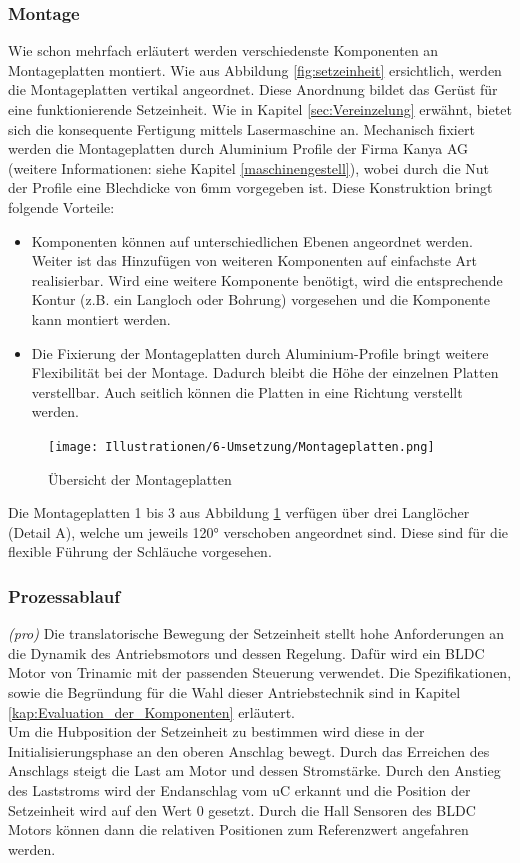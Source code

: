 \subsubsection{Montage}
Wie schon mehrfach erläutert werden verschiedenste Komponenten an Montageplatten montiert. Wie aus Abbildung \ref{fig:setzeinheit} ersichtlich, werden die Montageplatten vertikal angeordnet. Diese Anordnung bildet das Gerüst für eine funktionierende Setzeinheit. Wie in Kapitel \ref{sec:Vereinzelung} erwähnt, bietet sich die konsequente Fertigung mittels Lasermaschine an. Mechanisch fixiert werden die Montageplatten durch Aluminium Profile der Firma Kanya AG (weitere Informationen: siehe Kapitel \ref{maschinengestell}), wobei durch die Nut der Profile eine Blechdicke von 6mm vorgegeben ist. Diese Konstruktion bringt folgende Vorteile:
	\begin{itemize}
	\item Komponenten können auf unterschiedlichen Ebenen angeordnet werden. Weiter ist das Hinzufügen von weiteren Komponenten auf einfachste Art realisierbar. Wird eine weitere Komponente benötigt, wird die entsprechende Kontur (z.B. ein Langloch oder Bohrung) vorgesehen und die Komponente kann montiert werden.
	\item Die Fixierung der Montageplatten durch Aluminium-Profile bringt weitere Flexibilität bei der Montage. Dadurch bleibt die Höhe der einzelnen Platten verstellbar. Auch seitlich können die Platten in eine Richtung verstellt werden.
\end{itemize}
 	\begin{figure}[H]
	\texttt{[image: Illustrationen/6-Umsetzung/Montageplatten.png]}
	\caption{Übersicht der Montageplatten}
	\label{fig:montageplatten}
\end{figure}
Die Montageplatten 1 bis 3 aus Abbildung \ref{fig:montageplatten} verfügen über drei Langlöcher (Detail A), welche um jeweils 120° verschoben angeordnet sind. Diese sind für die flexible Führung der Schläuche vorgesehen.

\subsubsection{Prozessablauf}
\textit{(pro)} Die translatorische Bewegung der Setzeinheit stellt hohe Anforderungen an die Dynamik des Antriebsmotors und dessen Regelung. Dafür wird ein BLDC Motor von Trinamic mit der passenden Steuerung verwendet. Die Spezifikationen, sowie die Begründung für die Wahl dieser Antriebstechnik sind in Kapitel \ref{kap:Evaluation_der_Komponenten} erläutert.
\\ Um die Hubposition der Setzeinheit zu bestimmen wird diese in der Initialisierungsphase an den oberen Anschlag bewegt. Durch das Erreichen des Anschlags steigt die Last am Motor und dessen Stromstärke. Durch den Anstieg des Laststroms wird der Endanschlag vom uC erkannt und die Position der Setzeinheit wird auf den Wert 0 gesetzt. Durch die Hall Sensoren des BLDC Motors können dann die relativen Positionen zum Referenzwert angefahren werden.

